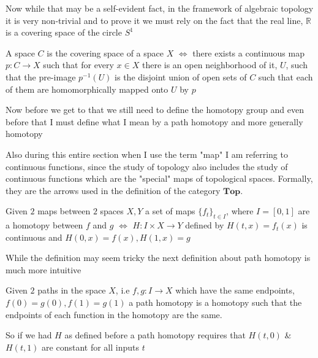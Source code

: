 \documentclass[paper=a4,fontsize=paper,12.5pt]{book}
\newcommand{\3}{\vspace*{3mm}}
\newcommand{\IFF}{$\Longleftrightarrow$ \hspace*{.5mm}}
\newcommand{\R}{\mathbb{R}}
\newcommand{\C}[1]{{S}^{#1}}
\begin{document}
\3

Now while that may be a self-evident fact, in the framework of algebraic topology it is very non-trivial and to prove it we must rely on the fact that the real line, $\R$ is a covering space of the circle $\C{1}$

\3

\begin{definition}

A space $C$ is the covering space of a space $X$ \IFF there exists a continuous map $p:C \to X$ such that for every $x \in X$ there is an open neighborhood of it, $U$, such that the pre-image ${p}^{-1}(U)$ is the disjoint union of open sets of $C$ such that each of them are homomorphically mapped onto $U$ by $p$


\end{definition}

\3

Now before we get to that we still need to define the homotopy group and even before that I must define what I mean by a path homotopy and more generally homotopy

\3

Also during this entire section when I use the term "map" I am referring to continuous functions, since the study of topology also includes the study of continuous functions which are the "special" maps of topological spaces. Formally, they are the arrows used in the definition of the category $\mathbf{Top}$.

\3

\begin{definition}

Given $2$ maps between $2$ spaces $X,Y$ a set of maps $\{{f}_{t}\}_{t \in I}$, where $I = [0,1]$ are a homotopy between $f$ and $g$ \IFF $H: I \times X \to Y$ defined by $H(t,x) = {f}_{t}(x)$ is continuous and $H(0,x) = f(x),H(1,x) = g$



\end{definition}

\3

While the definition may seem tricky the next definition about path homotopy is much more intuitive

\3

\begin{definition}

Given $2$ paths in the space $X$, i.e $f,g: I \to X$ which have the same endpoints, $f(0) = g(0), f(1) = g(1)$ a path homotopy is a homotopy such that the endpoints of each function in the homotopy are the same. 

\3

So if we had $H$ as defined before a path homotopy requires that $H(t,0)$ \&\ $H(t,1)$ are constant for all inputs $t$


\end{definition}
\end{document}

